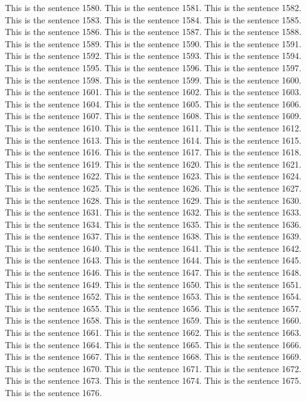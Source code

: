 \documentclass{article}
\begin{document}
This is the sentence 1580.
This is the sentence 1581.
This is the sentence 1582.
This is the sentence 1583.
This is the sentence 1584.
This is the sentence 1585.
This is the sentence 1586.
This is the sentence 1587.
This is the sentence 1588.
This is the sentence 1589.
This is the sentence 1590.
This is the sentence 1591.
This is the sentence 1592.
This is the sentence 1593.
This is the sentence 1594.
This is the sentence 1595.
This is the sentence 1596.
This is the sentence 1597.
This is the sentence 1598.
This is the sentence 1599.
This is the sentence 1600.
This is the sentence 1601.
This is the sentence 1602.
This is the sentence 1603.
This is the sentence 1604.
This is the sentence 1605.
This is the sentence 1606.
This is the sentence 1607.
This is the sentence 1608.
This is the sentence 1609.
This is the sentence 1610.
This is the sentence 1611.
This is the sentence 1612.
This is the sentence 1613.
This is the sentence 1614.
This is the sentence 1615.
This is the sentence 1616.
This is the sentence 1617.
This is the sentence 1618.
This is the sentence 1619.
This is the sentence 1620.
This is the sentence 1621.
This is the sentence 1622.
This is the sentence 1623.
This is the sentence 1624.
This is the sentence 1625.
This is the sentence 1626.
This is the sentence 1627.
This is the sentence 1628.
This is the sentence 1629.
This is the sentence 1630.
This is the sentence 1631.
This is the sentence 1632.
This is the sentence 1633.
This is the sentence 1634.
This is the sentence 1635.
This is the sentence 1636.
This is the sentence 1637.
This is the sentence 1638.
This is the sentence 1639.
This is the sentence 1640.
This is the sentence 1641.
This is the sentence 1642.
This is the sentence 1643.
This is the sentence 1644.
This is the sentence 1645.
This is the sentence 1646.
This is the sentence 1647.
This is the sentence 1648.
This is the sentence 1649.
This is the sentence 1650.
This is the sentence 1651.
This is the sentence 1652.
This is the sentence 1653.
This is the sentence 1654.
This is the sentence 1655.
This is the sentence 1656.
This is the sentence 1657.
This is the sentence 1658.
This is the sentence 1659.
This is the sentence 1660.
This is the sentence 1661.
This is the sentence 1662.
This is the sentence 1663.
This is the sentence 1664.
This is the sentence 1665.
This is the sentence 1666.
This is the sentence 1667.
This is the sentence 1668.
This is the sentence 1669.
This is the sentence 1670.
This is the sentence 1671.
This is the sentence 1672.
This is the sentence 1673.
This is the sentence 1674.
This is the sentence 1675.
This is the sentence 1676.
\end{document}
